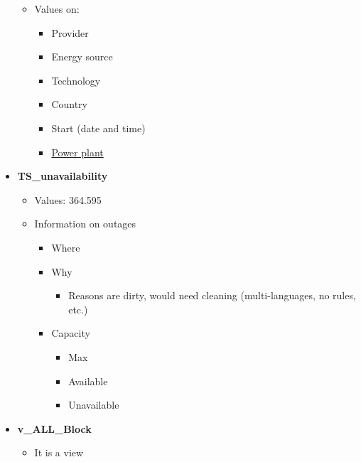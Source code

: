 \begin{itemize}
\begin{itemize}
            \item Values on:
            \begin{itemize}
                \item Provider
                \item Energy source
                \item Technology
                \item Country
                \item Start (date and time)
                \item \underline{Power plant}
            \end{itemize}
        \end{itemize}
        
        \item \textbf{TS\_unavailability}
        \begin{itemize}
            \item Values: 364.595 
            
            \item Information on outages
            \begin{itemize}
                \item Where
                
                \item Why
                \begin{itemize}
                    \item Reasons are dirty, would need cleaning (multi-languages, no rules, etc.)
                \end{itemize}
                
                \item Capacity
                \begin{itemize}
                    \item Max
                    \item Available
                    \item Unavailable
                \end{itemize}
            \end{itemize}
        \end{itemize}
        
        \item \textbf{v\_ALL\_Block}
        \begin{itemize}
            \item It is a view
            

\end{itemize}
\end{itemize}
